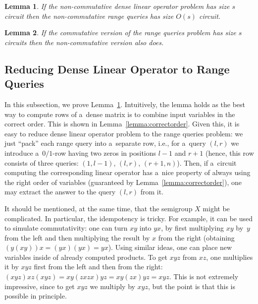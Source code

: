 \documentclass[11pt,letterpaper]{article}
\newtheorem{lemma}{Lemma}
\begin{document}
\begin{lemma} \label{lem:dense_matrices}
If the non-commutative dense linear operator problem has size $s$ circuit then the non-commutative range queries has size $O(s)$ circuit.
\end{lemma}

\begin{lemma} \label{lem:intervals}
If the commutative version of the range queries problem has size $s$ circuits then the non-commutative version also does.
\end{lemma}

\subsection{Reducing Dense Linear Operator to Range Queries}
In this subsection, we prove Lemma~\ref{lem:dense_matrices}. Intuitively, the lemma holds as the best way to compute rows of a~dense matrix is to combine input variables in the correct order. This is shown in Lemma~\ref{lemma:correctorder}. Given this, it is easy to reduce dense linear operator problem to the range queries problem: we just ``pack'' each range query into a~separate row, i.e., for a~query $(l,r)$ we introduce a~$0/1$-row having two zeros in positions $l-1$ and $r+1$ (hence, this row consists of three queries: $(1,l-1)$, $(l,r)$, $(r+1,n)$). Then, if a~circuit computing the corresponding linear operator has a~nice property of always using the right order of variables (guaranteed by Lemma~\ref{lemma:correctorder}), one may extract the answer to the query $(l,r)$ from it.

It should be mentioned, at the same time, that the semigroup $X$ might be complicated. In particular, the idempotency is tricky. For example, it can be used to simulate commutativity: one can turn $xy$ into $yx$, by first multiplying $xy$ by~$y$ from the left and then multiplying the result by $x$ from the right (obtaining $(y(xy))x=(yx)(yx)=yx$). Using similar ideas, one can place new variables inside of already computed products. To get $xyz$ from $xz$, one multiplies it by $xyz$ first from the left and then from the right: $(xyz)xz(xyz)=xy(zxzx)yz=xy(zx)yz=xyz$.
This is not extremely impressive, since to get $xyz$ we multiply by $xyz$, but the point is that this is possible in principle.
\end{document}
